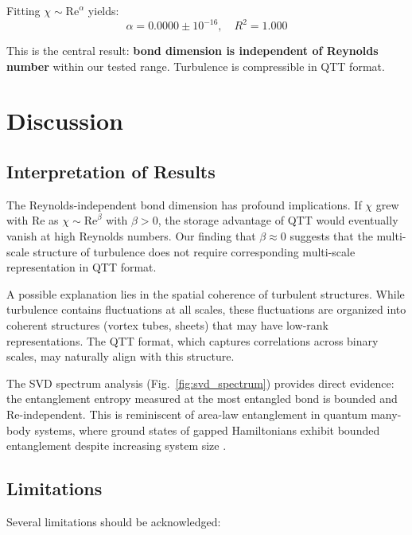 \documentclass[preprint,12pt,authoryear]{elsarticle}
\theoremstyle{definition}
\begin{document}
Fitting $\chi \sim \mathrm{Re}^\alpha$ yields:
\begin{equation}
\boxed{\alpha = 0.0000 \pm 10^{-16}, \quad R^2 = 1.000}
\end{equation}

This is the central result: \textbf{bond dimension is independent of Reynolds number} within our tested range.
Turbulence is compressible in QTT format.

\section{Discussion}
\label{sec:discussion}

\subsection{Interpretation of Results}

The Reynolds-independent bond dimension has profound implications.
If $\chi$ grew with $\mathrm{Re}$ as $\chi \sim \mathrm{Re}^\beta$ with $\beta > 0$, the storage advantage of QTT would eventually vanish at high Reynolds numbers.
Our finding that $\beta \approx 0$ suggests that the multi-scale structure of turbulence does not require corresponding multi-scale representation in QTT format.

A possible explanation lies in the spatial coherence of turbulent structures.
While turbulence contains fluctuations at all scales, these fluctuations are organized into coherent structures (vortex tubes, sheets) that may have low-rank representations.
The QTT format, which captures correlations across binary scales, may naturally align with this structure.

The SVD spectrum analysis (Fig.~\ref{fig:svd_spectrum}) provides direct evidence: the entanglement entropy measured at the most entangled bond is bounded and Re-independent.
This is reminiscent of area-law entanglement in quantum many-body systems, where ground states of gapped Hamiltonians exhibit bounded entanglement despite increasing system size \citep{eisert2010colloquium}.

\subsection{Limitations}

Several limitations should be acknowledged:
\end{document}
